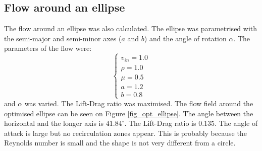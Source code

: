 \documentclass[12pt, a4paper]{article}
\begin{document}
    \subsection{Flow around an ellipse}
        The flow around an ellipse was also calculated. The ellipse was parametrised with the semi-major and semi-minor axes ($a$ and $b$) and the angle of rotation $\alpha$. The parameters of the flow were:
        \begin{equation}
        \begin{cases}
        v_{in} = 1.0 \\
        \rho = 1.0 \\
        \mu = 0.5 \\
        a = 1.2 \\
        b = 0.8
        \end{cases}
        \end{equation}
        and $\alpha$ was varied. The Lift-Drag ratio was maximised. The flow field around the optimised ellipse can be seen on Figure \ref{fig_opt_ellipse}. The angle between the horizontal and the longer axis is $41.84^{\circ}$. The Lift-Drag ratio is $0.135$. The angle of attack is large but no recirculation zones appear. This is probably because the Reynolds number is small and the shape is not very different from a circle.
\end{document}

